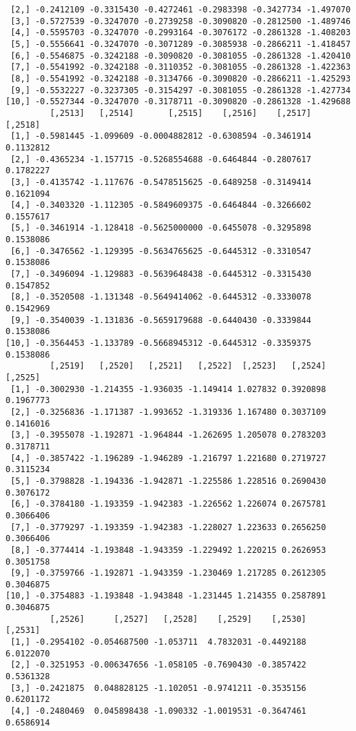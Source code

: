 \documentclass[
  letterpaper,
  DIV=11,
  numbers=noendperiod]{scrreprt}
\begin{document}
\begin{verbatim}
 [2,] -0.2412109 -0.3315430 -0.4272461 -0.2983398 -0.3427734 -1.497070
 [3,] -0.5727539 -0.3247070 -0.2739258 -0.3090820 -0.2812500 -1.489746
 [4,] -0.5595703 -0.3247070 -0.2993164 -0.3076172 -0.2861328 -1.408203
 [5,] -0.5556641 -0.3247070 -0.3071289 -0.3085938 -0.2866211 -1.418457
 [6,] -0.5546875 -0.3242188 -0.3090820 -0.3081055 -0.2861328 -1.420410
 [7,] -0.5541992 -0.3242188 -0.3110352 -0.3081055 -0.2861328 -1.422363
 [8,] -0.5541992 -0.3242188 -0.3134766 -0.3090820 -0.2866211 -1.425293
 [9,] -0.5532227 -0.3237305 -0.3154297 -0.3081055 -0.2861328 -1.427734
[10,] -0.5527344 -0.3247070 -0.3178711 -0.3090820 -0.2861328 -1.429688
         [,2513]   [,2514]       [,2515]    [,2516]    [,2517]   [,2518]
 [1,] -0.5981445 -1.099609 -0.0004882812 -0.6308594 -0.3461914 0.1132812
 [2,] -0.4365234 -1.157715 -0.5268554688 -0.6464844 -0.2807617 0.1782227
 [3,] -0.4135742 -1.117676 -0.5478515625 -0.6489258 -0.3149414 0.1621094
 [4,] -0.3403320 -1.112305 -0.5849609375 -0.6464844 -0.3266602 0.1557617
 [5,] -0.3461914 -1.128418 -0.5625000000 -0.6455078 -0.3295898 0.1538086
 [6,] -0.3476562 -1.129395 -0.5634765625 -0.6445312 -0.3310547 0.1538086
 [7,] -0.3496094 -1.129883 -0.5639648438 -0.6445312 -0.3315430 0.1547852
 [8,] -0.3520508 -1.131348 -0.5649414062 -0.6445312 -0.3330078 0.1542969
 [9,] -0.3540039 -1.131836 -0.5659179688 -0.6440430 -0.3339844 0.1538086
[10,] -0.3564453 -1.133789 -0.5668945312 -0.6445312 -0.3359375 0.1538086
         [,2519]   [,2520]   [,2521]   [,2522]  [,2523]   [,2524]   [,2525]
 [1,] -0.3002930 -1.214355 -1.936035 -1.149414 1.027832 0.3920898 0.1967773
 [2,] -0.3256836 -1.171387 -1.993652 -1.319336 1.167480 0.3037109 0.1416016
 [3,] -0.3955078 -1.192871 -1.964844 -1.262695 1.205078 0.2783203 0.3178711
 [4,] -0.3857422 -1.196289 -1.946289 -1.216797 1.221680 0.2719727 0.3115234
 [5,] -0.3798828 -1.194336 -1.942871 -1.225586 1.228516 0.2690430 0.3076172
 [6,] -0.3784180 -1.193359 -1.942383 -1.226562 1.226074 0.2675781 0.3066406
 [7,] -0.3779297 -1.193359 -1.942383 -1.228027 1.223633 0.2656250 0.3066406
 [8,] -0.3774414 -1.193848 -1.943359 -1.229492 1.220215 0.2626953 0.3051758
 [9,] -0.3759766 -1.192871 -1.943359 -1.230469 1.217285 0.2612305 0.3046875
[10,] -0.3754883 -1.193848 -1.943848 -1.231445 1.214355 0.2587891 0.3046875
         [,2526]      [,2527]   [,2528]    [,2529]    [,2530]   [,2531]
 [1,] -0.2954102 -0.054687500 -1.053711  4.7832031 -0.4492188 6.0122070
 [2,] -0.3251953 -0.006347656 -1.058105 -0.7690430 -0.3857422 0.5361328
 [3,] -0.2421875  0.048828125 -1.102051 -0.9741211 -0.3535156 0.6201172
 [4,] -0.2480469  0.045898438 -1.090332 -1.0019531 -0.3647461 0.6586914

\end{verbatim}
\end{document}
